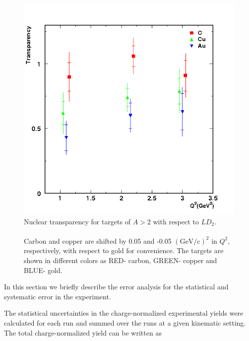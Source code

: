 \begin{figure}[!tbp]
  \centering
  \includegraphics[width=0.8\columnwidth]{transp2}
  \caption[Nuclear transparency for targets of $A>$2 with respect to $LD_2$.]{\label{fig:transp2}Nuclear transparency for targets of $A>$2 with respect to $LD_2$.\\\\ Carbon and copper are shifted by 0.05 and -0.05 $(\mathrm{GeV/c})^2$ in $Q^2$, respectively, with respect to gold for convenience. The targets are shown in different colors as RED- carbon, GREEN- copper and BLUE- gold.}
\end{figure}

%
%
\label{Error Calculation}
In this section we briefly describe the error analysis for the statistical and systematic error in the experiment.

%
\label{Statistical Error Calculation}
The statistical uncertainties in the charge-normalized experimental yields were calculated for each run and summed over the runs at a given kinematic setting. The total charge-normalized yield can be written as

